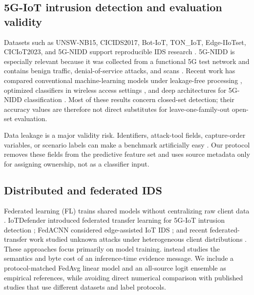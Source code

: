 \subsection{5G-IoT intrusion detection and evaluation validity}

Datasets such as UNSW-NB15, CICIDS2017, Bot-IoT, TON\_IoT, Edge-IIoTset, CICIoT2023, and 5G-NIDD support reproducible IDS research \cite{moustafa2015unsw,sharafaldin2018cicids,koroniotis2019botiot,alsaedi2020toniot,ferrag2022edgeiiot,neto2023ciciot,siriwardhana2025descriptor}. 5G-NIDD is especially relevant because it was collected from a functional 5G test network and contains benign traffic, denial-of-service attacks, and scans \cite{siriwardhana2025descriptor,fivegnidddata}. Recent work has compared conventional machine-learning models under leakage-free processing \cite{bouke2024leakage}, optimized classifiers in wireless access settings \cite{ismail2025adaptive}, and deep architectures for 5G-NIDD classification \cite{deeptransids2025}. Most of these results concern closed-set detection; their accuracy values are therefore not direct substitutes for leave-one-family-out open-set evaluation.

Data leakage is a major validity risk. Identifiers, attack-tool fields, capture-order variables, or scenario labels can make a benchmark artificially easy \cite{bouke2024leakage,sommer2010outside}. Our protocol removes these fields from the predictive feature set and uses source metadata only for assigning ownership, not as a classifier input.

\subsection{Distributed and federated IDS}

Federated learning (FL) trains shared models without centralizing raw client data \cite{mcmahan2017fedavg,kairouz2021fl}. IoTDefender introduced federated transfer learning for 5G-IoT intrusion detection \cite{iotdefender2020}; FedACNN considered edge-assisted IoT IDS \cite{man2021fedacnn}; and recent federated-transfer work studied unknown attacks under heterogeneous client distributions \cite{bellmunt2026ftl}. These approaches focus primarily on model training. \method{} instead studies the semantics and byte cost of an inference-time evidence message. We include a protocol-matched FedAvg linear model and an all-source logit ensemble as empirical references, while avoiding direct numerical comparison with published studies that use different datasets and label protocols.

